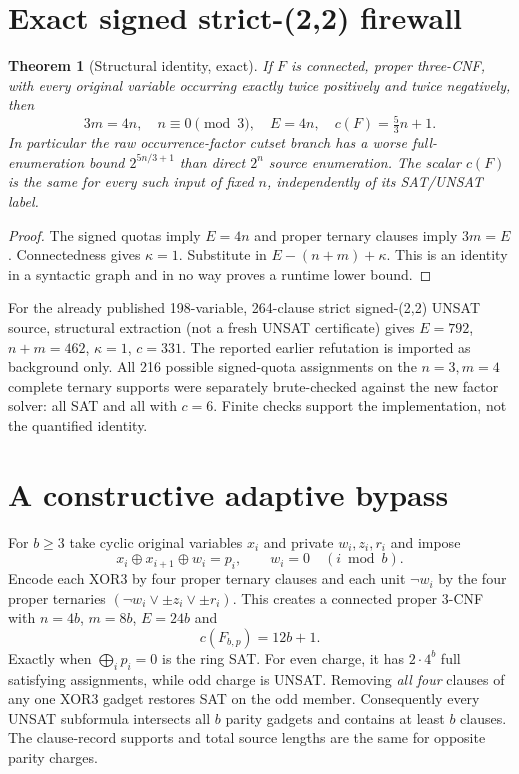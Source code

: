 \documentclass[11pt]{article}
\newtheorem{theorem}{Theorem}
\begin{document}
\section{Exact signed strict-(2,2) firewall}
\begin{theorem}[Structural identity, exact]
If $F$ is connected, proper three-CNF, with every original variable occurring exactly twice positively and twice negatively, then
\[
3m=4n,\quad n\equiv0\pmod3,\quad E=4n,\quad
\boxed{c(F)=\tfrac53n+1.}
\]
In particular the raw occurrence-factor cutset branch has a worse full-enumeration bound $2^{5n/3+1}$ than direct $2^n$ source enumeration. The scalar $c(F)$ is the \emph{same} for every such input of fixed $n$, independently of its SAT/UNSAT label.
\end{theorem}
\begin{proof}
The signed quotas imply $E=4n$ and proper ternary clauses imply $3m=E$. Connectedness gives $\kappa=1$. Substitute in $E-(n+m)+\kappa$. This is an identity in a syntactic graph and in no way proves a runtime lower bound.
\end{proof}
For the already published 198-variable, 264-clause strict signed-(2,2) UNSAT source, structural extraction (not a fresh UNSAT certificate) gives $E=792$, $n+m=462$, $\kappa=1$, $c=331$. The reported earlier refutation is imported as background only. All 216 possible signed-quota assignments on the $n=3,m=4$ complete ternary supports were separately brute-checked against the new factor solver: all SAT and all with $c=6$. Finite checks support the implementation, not the quantified identity.

\section{A constructive adaptive bypass}
For $b\ge3$ take cyclic original variables $x_i$ and private $w_i,z_i,r_i$ and impose
\[
x_i\oplus x_{i+1}\oplus w_i=p_i,\qquad w_i=0\quad (i\bmod b).
\]
Encode each XOR3 by four proper ternary clauses and each unit $\neg w_i$ by the four proper ternaries $(\neg w_i\vee\pm z_i\vee\pm r_i)$. This creates a connected proper 3-CNF with $n=4b$, $m=8b$, $E=24b$ and
\[
\boxed{c(F_{b,p})=12b+1.}
\]
Exactly when $\bigoplus_i p_i=0$ is the ring SAT. For even charge, it has $2\cdot4^b$ full satisfying assignments, while odd charge is UNSAT. Removing \emph{all four} clauses of any one XOR3 gadget restores SAT on the odd member. Consequently every UNSAT subformula intersects all $b$ parity gadgets and contains at least $b$ clauses. The clause-record supports and total source lengths are the same for opposite parity charges.
\end{document}
